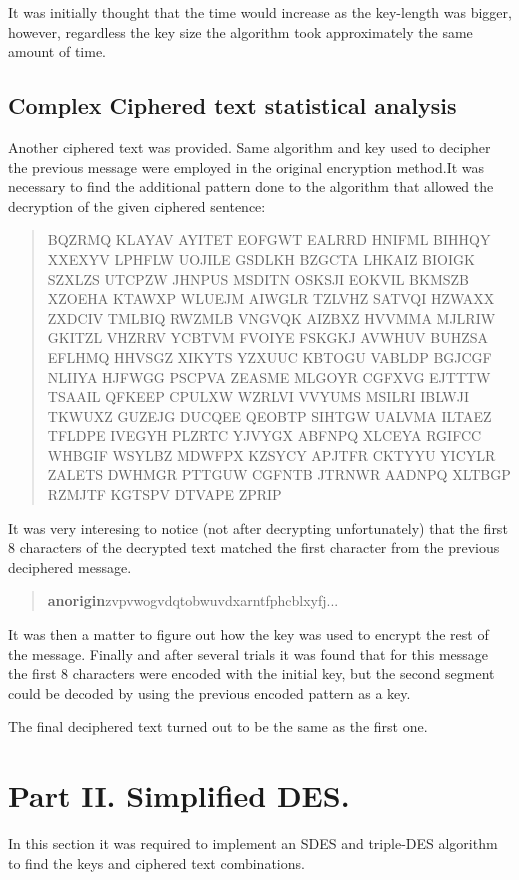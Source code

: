 \documentclass[letterpaper,12pt]{article}
\begin{document}
It was initially thought that the time would increase as the key-length was bigger, however, regardless the key size the algorithm took approximately the same amount of time.

\subsection{Complex Ciphered text statistical analysis }
Another ciphered text was provided. Same algorithm and key used to decipher the previous message were employed in the original encryption method.It was necessary to find the additional pattern done to the algorithm that allowed the decryption of the given ciphered sentence:

\begin{quote}
BQZRMQ KLAYAV AYITET EOFGWT EALRRD HNIFML BIHHQY XXEXYV LPHFLW UOJILE GSDLKH
BZGCTA LHKAIZ BIOIGK SZXLZS UTCPZW JHNPUS MSDITN OSKSJI EOKVIL BKMSZB XZOEHA
KTAWXP WLUEJM AIWGLR TZLVHZ SATVQI HZWAXX ZXDCIV TMLBIQ RWZMLB VNGVQK AIZBXZ
HVVMMA MJLRIW GKITZL VHZRRV YCBTVM FVOIYE FSKGKJ AVWHUV BUHZSA EFLHMQ HHVSGZ
XIKYTS YZXUUC KBTOGU VABLDP BGJCGF NLIIYA HJFWGG PSCPVA ZEASME MLGOYR CGFXVG
EJTTTW TSAAIL QFKEEP CPULXW WZRLVI VVYUMS MSILRI IBLWJI TKWUXZ GUZEJG DUCQEE
QEOBTP SIHTGW UALVMA ILTAEZ TFLDPE IVEGYH PLZRTC YJVYGX ABFNPQ XLCEYA RGIFCC WHBGIF
WSYLBZ MDWFPX KZSYCY APJTFR CKTYYU YICYLR ZALETS DWHMGR PTTGUW CGFNTB JTRNWR
AADNPQ XLTBGP RZMJTF KGTSPV DTVAPE ZPRIP
\end{quote}

It was very interesing to notice (not after decrypting unfortunately) that the first 8 characters of the decrypted text matched the first character from the previous deciphered message.

\begin{quote}
    \textbf{anorigin}zvpvwogvdqtobwuvdxarntfphcblxyfj...
\end{quote}

It was then a matter to figure out how the key was used to encrypt the rest of the message. Finally and after several trials it was found that for this message the first 8 characters were encoded with the initial key, but the second segment could be decoded by using the previous encoded pattern as a key.

The final deciphered text turned out to be the same as the first one.

\section{Part II. Simplified DES.}
In this section it was required to implement an SDES and triple-DES algorithm to find the keys and ciphered text combinations.
\end{document}
